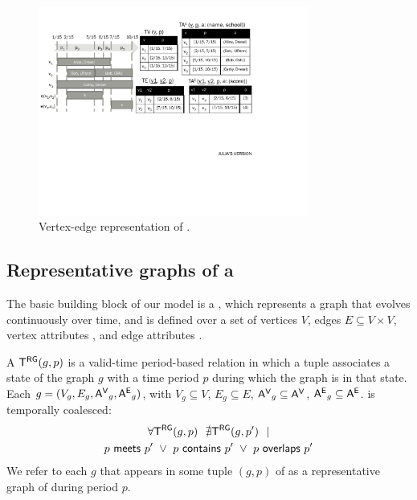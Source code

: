 \begin{figure}
\centering
\includegraphics[width=3.5in]{figs/T1_rel_tab.pdf}
\caption{Vertex-edge representation of \tg
  .}
\label{fig:tg_ve}
\end{figure}



\subsection{Representative graphs of a \tg}
\label{sec:model:rg}

The basic building block of our model is a \tg, which represents a
graph that evolves continuously over time, and is defined over a set
of vertices $V$, edges $E\subseteq V \times V$, vertex attributes
\avv, and edge attributes \aee.

\begin{definition}[TGraph]
A \tg $\mathsf{T^{RG}}(g, p)$ is a valid-time period-based relation in which a
tuple associates a state of the graph $g$ with a time period $p$
during which the graph is in that state.
%
Each $g = (V_g, E_g, \mathsf{A^{V}}_g, \mathsf{A^{E}}_g)$, with $V_g \subseteq V$, $E_g
\subseteq E$, $\mathsf{A^{V}}_g \subseteq \mathsf{A^{V}}$, $\mathsf{A^{E}}_g \subseteq \mathsf{A^{E}}$.
%
\tgg is temporally coalesced:
\begin{multline}
\forall \mathsf{T^{RG}}(g,p)~~\nexists \mathsf{T^{RG}}(g,p')~~| \\
        p~\mathsf{meets}~p'~\lor~p~\mathsf{contains}~p'~\lor~p~\mathsf{overlaps}~p'
\end{multline}
We refer to each $g$ that appears in some tuple $(g,p)$ of \tgg as a
representative graph of \tgg during period $p$.
\label{def:tg_abstract}
\end{definition}

